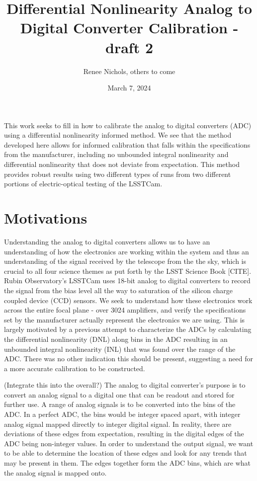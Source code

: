 \documentclass[11pt, letterpaper]{article}
\title{Differential Nonlinearity Analog to Digital Converter Calibration - draft 2}
\author{Renee Nichols, others to come}
\date{March 7, 2024}
\begin{document}
\maketitle 

This work seeks to fill in how to calibrate the analog to digital converters (ADC) using a differential nonlinearity informed method. We see that the method developed here allows for informed calibration that falls within the specifications from the manufacturer, including no unbounded integral nonlinearity and differential nonlinearity that does not deviate from expectation. This method provides robust results using two different types of runs from two different portions of electric-optical testing of the LSSTCam. 

\section{Motivations}
\indent


Understanding the analog to digital converters allows us to have an understanding of how the electronics are working within the system and thus an understanding of the signal received by the telescope from the the sky, which is crucial to all four science themes as put forth by the LSST Science Book [CITE]. 
Rubin Observatory’s LSSTCam uses 18-bit analog to digital converters to record the signal from the bias level all the way to saturation of the silicon charge coupled device (CCD) sensors. 
We seek to understand how these electronics work across the entire focal plane - over 3024 amplifiers, and verify the specifications set by the manufacturer actually represent the electronics we are using. 
This is largely motivated by a previous attempt to characterize the ADCs by calculating the differential nonlinearity (DNL) along bins in the ADC resulting in an unbounded integral nonlinearity (INL) that was found over the range of the ADC. 
There was no other indication this should be present, suggesting a need for a more accurate calibration to be constructed. 

(Integrate this into the overall?) 
The analog to digital converter’s purpose is to convert an analog signal to a digital one that can be readout and stored for further use. 
A range of analog signals is to be converted into the bins of the ADC. In a perfect ADC, the bins would be integer spaced apart, with integer analog signal mapped directly to integer digital signal.
In reality, there are deviations of these edges from expectation, resulting in the digital edges of the ADC being non-integer values. In order to understand the output signal, we want to be able to determine the location of these edges and look for any trends that may be present in them. 
The edges together form the ADC bins, which are what the analog signal is mapped onto. 
\end{document}
